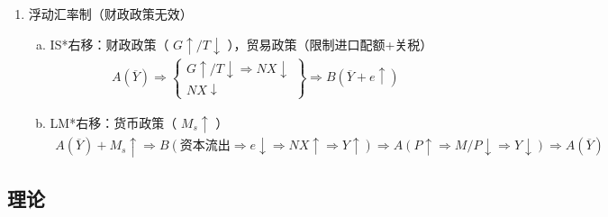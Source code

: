 \documentclass[12pt]{book}
\begin{document}
\begin{enumerate}[1.]
\begin{enumerate}[(1)]
\begin{enumerate}[a.]
        \end{enumerate}
        \item 浮动汇率制（财政政策无效）
        \begin{enumerate}[a.]
            \item IS*右移：财政政策（ $G↑/T↓$ ），贸易政策（限制进口配额+关税）
            \begin{gather*}
                A(\overline{Y})\Rightarrow \left\{\begin{matrix} G↑/T↓\Rightarrow NX↓\\ NX↓ \end{matrix}\right\} \Rightarrow B(\overline{Y}+e↑) 
            \end{gather*}
            \item LM*右移：货币政策（ $M_s\uparrow$ ）
            \begin{gather*}
                A(\overline{Y})+M_s\uparrow \Rightarrow B(资本流出\Rightarrow e\downarrow\Rightarrow NX\uparrow\Rightarrow Y\uparrow) \Rightarrow A(P\uparrow\Rightarrow M/P\downarrow\Rightarrow Y\downarrow) \Rightarrow A(\overline{Y})  
            \end{gather*}
        \end{enumerate}
        
        
    \end{enumerate}
\end{enumerate}





















\subsection{理论}
\end{document}
